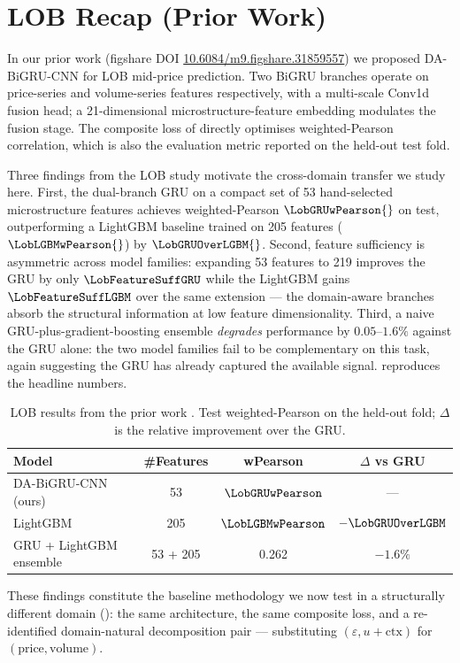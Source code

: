 \section{LOB Recap (Prior Work)}
\label{sec:lob-recap}

In our prior work \cite{solovev2026lob}
(figshare DOI \href{https://doi.org/10.6084/m9.figshare.31859557}%
{10.6084/m9.figshare.31859557}) we proposed DA-BiGRU-CNN for LOB
mid-price prediction.  Two BiGRU branches operate on price-series and
volume-series features respectively, with a multi-scale Conv1d fusion
head; a 21-dimensional microstructure-feature embedding modulates the
fusion stage.  The composite loss of  directly
optimises weighted-Pearson correlation, which is also the evaluation
metric reported on the held-out test fold.

Three findings from the LOB study motivate the cross-domain transfer we
study here.  First, the dual-branch GRU on a compact set of 53
hand-selected microstructure features achieves
weighted-Pearson $\LobGRUwPearson{}$ on test, outperforming a
LightGBM \cite{ke2017lightgbm} baseline trained on 205 features
($\LobLGBMwPearson{}$) by $\LobGRUOverLGBM{}$.  Second, feature
sufficiency is asymmetric across model families: expanding 53 features
to 219 improves the GRU by only $\LobFeatureSuffGRU$ while the LightGBM
gains $\LobFeatureSuffLGBM$ over the same extension --- the
domain-aware branches absorb the structural information at low feature
dimensionality.  Third, a naive GRU-plus-gradient-boosting ensemble
\emph{degrades} performance by $0.05$--$1.6\%$ against the GRU alone:
the two model families fail to be complementary on this task, again
suggesting the GRU has already captured the available signal.
 reproduces the headline numbers.

\begin{table}[t]
\centering
\caption{LOB results from the prior work \cite{solovev2026lob}.
Test weighted-Pearson on the held-out fold; $\Delta$ is the relative
improvement over the GRU.}
\label{tab:lob-recap}
\begin{tabular}{lccc}
\toprule
Model & \#Features & wPearson & $\Delta$ vs GRU \\
\midrule
DA-BiGRU-CNN (ours) & 53  & $\LobGRUwPearson$  & --- \\
LightGBM            & 205 & $\LobLGBMwPearson$ & $-\LobGRUOverLGBM$ \\
GRU + LightGBM ensemble & 53 + 205 & 0.262 & $-1.6\%$ \\
\bottomrule
\end{tabular}
\end{table}

These findings constitute the baseline methodology we now test in a
structurally different domain (): the same architecture, the same composite loss,
and a re-identified domain-natural decomposition pair --- substituting
$(\varepsilon, u+\text{ctx})$ for $(\text{price}, \text{volume})$.
